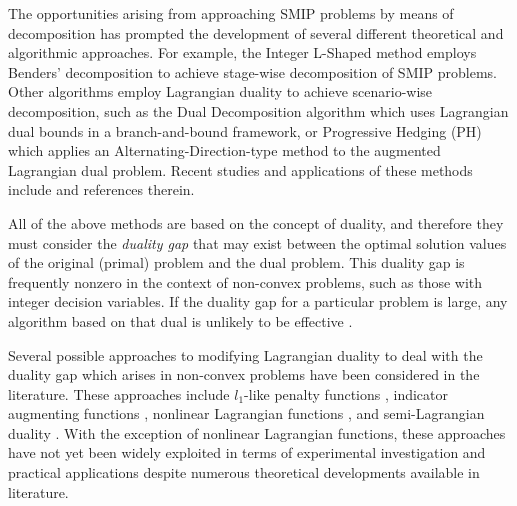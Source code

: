 \documentclass[preprint, 1p, review]{elsarticle}
\begin{document}
The opportunities arising from approaching SMIP problems by means of decomposition has prompted the development of several different theoretical and algorithmic approaches. For example, the Integer L-Shaped method \cite{LaporteLSH_IP1993} employs Benders' decomposition to achieve stage-wise decomposition of SMIP problems. Other algorithms employ Lagrangian duality to achieve scenario-wise decomposition, such as the Dual Decomposition algorithm \cite{CaroeDuDe1999} which uses Lagrangian dual bounds in a branch-and-bound framework, or Progressive Hedging (PH) \cite{RockafellarPH1991,LokkeTabuPH1996, WatsonWoodruff2011, Velizetal2015} which applies an Alternating-Direction-type method to the augmented Lagrangian dual problem.
Recent studies and applications of these methods include \cite{AnguloLSH_IP2016,GuoPHDD2015,LubinParDD2013,GadeLBPH2016} and references therein.

All of the above methods are based on the concept of duality, and therefore they must consider the \emph{duality gap} that may exist between the optimal solution values of the original (primal) problem and the dual problem. This duality gap is frequently nonzero in the context of non-convex problems, such as those with integer decision variables. If the duality gap for a particular problem is large, any algorithm based on that dual is unlikely to be effective \cite{ChenLD2010}.

Several possible approaches to modifying Lagrangian duality to deal with the duality gap which arises in non-convex problems have been considered in the literature. These approaches include $l_1$-like penalty functions \cite{ChenLD2010}, indicator augmenting functions \cite{LalithaIndicatorLD2010}, nonlinear Lagrangian functions \cite{YangNLLD2001}, and semi-Lagrangian duality \cite{BeltranSemiL2006}. With the exception of nonlinear Lagrangian functions, these approaches have not yet been widely exploited in terms of experimental investigation and practical applications despite numerous theoretical developments available in literature.
\end{document}
